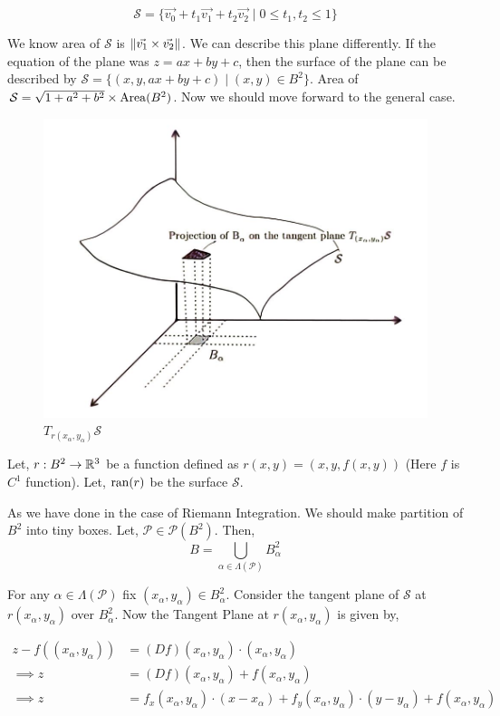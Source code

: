 \documentclass[../Analysis-3.tex]{subfiles}
\begin{document}
$$ \mathcal{S} = \{ \vec{v_0} + t_1 \vec{v_1} +t_2 \vec{v_2} \mid 0 \le t_1,t_2 \le 1\} $$

We know area of $\mathcal{S}$ is $\norm{\vec{v_1}\times \vec{v_2}}$. We can describe this plane differently. If the equation of the plane was $z=ax+by+c$, then the surface of the plane can be described by $\mathcal{S} = \{(x, y, ax+by+c) \mid (x,y) \in B^2 \}$. Area of $\mathcal{S} = \sqrt{1+a^2+b^2} \times \operatorname{Area}(B^2)$. Now we should move forward to the general case.

\begin{figure}
  \centering
  \includegraphics[width=.78\linewidth]{../figures/lec-25.2.png}
  \caption{$T_{r(x_{\alpha},y_{\alpha})} \mathcal{S}$}
\end{figure}


Let, $r : B^2 \to \mathbb{R}^3$ be a function defined as $r(x,y) = (x,y,f(x,y))$ (Here $f$ is $C^1$ function). Let, $\operatorname{ran}(r)$ be the surface $\mathcal{S}$.

\msk

As we have done in the case of Riemann Integration. We should make partition of $B^2$ into tiny boxes.  Let, $\mathcal{P} \in \mathscr{P}(B^2)$. Then,
\[B = \bigcup_{\alpha \in \Lambda(\mathcal{P})} B_{\alpha}^2\]

For any $\alpha \in \Lambda(\mathcal{P})$ fix $(x_{\alpha},y_{\alpha}) \in B_{\alpha}^2$. Consider the tangent plane of $\mathcal{S}$ at $r(x_{\alpha},y_{\alpha})$ over $B_{\alpha}^2$. Now the Tangent Plane at $r(x_{\alpha},y_{\alpha})$ is given by,

\begin{align*}
  z - f((x_{\alpha},y_{\alpha})) & = (Df)(x_{\alpha},y_{\alpha}) \cdot (x_{\alpha},y_{\alpha})                                                                       \\
  \implies z                     & = (Df)(x_{\alpha},y_{\alpha}) + f(x_{\alpha},y_{\alpha})                                                                          \\
  \implies z                     & = f_x(x_{\alpha},y_{\alpha}) \cdot (x - x_{\alpha}) +f_y(x_{\alpha},y_{\alpha}) \cdot (y - y_{\alpha}) + f(x_{\alpha},y_{\alpha}) \\
\end{align*}
\end{document}
